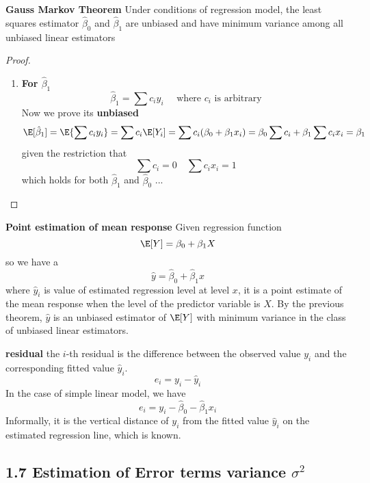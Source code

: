 \documentclass[11pt]{article}
\begin{document}
\begin{defn*}
    \textbf{Gauss Markov Theorem} Under conditions of regression model, the least squares estimator $\hat{\beta}_0$ and $\hat{\beta}_1$ are unbiased and have minimum variance among all unbiased linear estimators
    \begin{proof}
        \begin{enumerate}
            \item \textbf{For $\hat{\beta}_1$}
            \[
                \hat{\beta}_1 = \sum c_i y_i \quad \text{ where $c_i$ is arbitrary}
            \]
            Now we prove its \textbf{unbiased}
            \[
                \E[\hat{\beta}_1] = \E\{\sum c_i y_i \} = \sum c_i \E[Y_i] = \sum c_i (\beta_0 + \beta_1 x_i) = \beta_0 \sum c_i + \beta_1 \sum c_i x_i = \beta_1
            \]
            given the restriction that 
            \[
                \sum c_i = 0 \quad \sum c_i x_i = 1
            \]
            which holds for both $\hat{\beta}_1$ and $\hat{\beta}_0$
            ...
        \end{enumerate}
    \end{proof}
\end{defn*}


\begin{defn*}
    \textbf{Point estimation of mean response} Given regression function
    \[
        \E[Y] = \beta_0 + \beta_1 X 
    \]
    so we have a 
    \[
        \hat{y} = \hat{\beta}_0 + \hat{\beta}_1 x
    \]
    where $\hat{y}_i$ is value of estimated regression level at level $x$, it is a point estimate of the mean response when the level of the predictor variable is $X$. By the previous theorem, $\hat{y}$ is an unbiased estimator of $\E[Y]$ with minimum variance in the class of unbiased linear estimators. 
\end{defn*}


\begin{defn*}
    \textbf{residual} the $i$-th residual is the difference between the observed value $y_i$ and the corresponding fitted value $\hat{y}_i$. 
    \[
        e_i = y_i - \hat{y}_i
    \]
    In the case of simple linear model, we have 
    \[
        e_i = y_i - \hat{\beta}_0 - \hat{\beta}_1 x_i
    \]
    Informally, it is the vertical distance of $y_i$ from the fitted value $\hat{y}_i$ on the estimated regression line, which is known. 
\end{defn*}


\subsection*{1.7 Estimation of Error terms variance $\sigma^2$}
\end{document}
